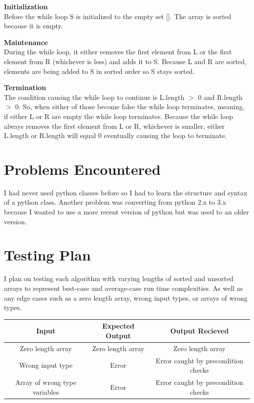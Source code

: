 \documentclass[a4paper]{article}
\newenvironment{myindentpar}[1]%
  {\begin{list}{}%
          {\setlength{\leftmargin}{#1}}%
          \item[]%
  }
  {\end{list}}
\begin{document}
    \begin{myindentpar}{0.5cm}
        \textbf{Initialization}\\
        Before the while loop S is initialized to the empty set []. The array is 
        sorted because it is empty.

        \textbf{Maintenance}\\
        During the while loop, it either removes the first element from L or the first 
        element from R (whichever is less) and adds it to S. Because L and R are sorted,
        elements are being added to S in sorted order so S stays sorted.

        \textbf{Termination}\\
        The condition causing the while loop to continue is L.length $>$ 0 and R.length $>$ 0.
        So, when either of those become false the while loop terminates, meaning, if either 
        L or R are empty the while loop terminates. Because the while loop always removes 
        the first element from L or R, whichever is smaller, either L.length or R.length 
        will equal 0 eventually causing the loop to terminate.

    \end{myindentpar}

    \newpage
    \section{Problems Encountered}
    I had never used python classes before so I had to learn the structure and syntax
    of a python class. Another problem was converting from python 2.x to 3.x because
    I wanted to use a more recent version of python but was used to an older version.

    \section{Testing Plan}
    I plan on testing each algorithm with varying lengths of sorted and unsorted arrays 
    to represent best-case and average-case run time complexities. As well as any edge
    cases such as a zero length array, wrong input types, or arrays of wrong types.

    \vspace{0.5cm}
    \begin{tabular}{ |c|c|c| }
        \hline
        Input             & Expected Output   & Output Recieved   \\ \hline
        Zero length array & Zero length array & Zero length array \\ \hline
        Wrong input type  & Error             & Error caught by precondition checks \\ \hline
        Array of wrong type variables & Error & Error caught by precondition checks \\ \hline
    \end{tabular}
\end{document}
